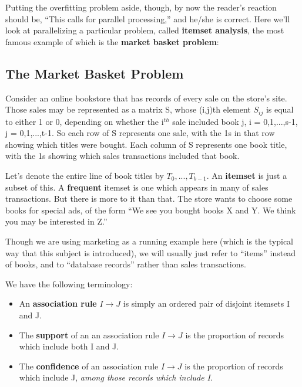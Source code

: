 Putting the overfitting problem aside, though, by now the reader's
reaction should be, ``This calls for parallel processing,'' and he/she
is correct.  Here we'll look at parallelizing a particular problem,
called {\bf itemset analysis}, the most famous example of which is the
{\bf market basket problem}:

\subsection{The Market Basket Problem}

Consider an online bookstore that has records of every sale on the
store's site.  Those sales may be represented as a matrix S, whose
(i,j)th element $S_{ij}$ is equal to either 1 or 0, depending on whether
the i$^{th}$ sale included book j, i = 0,1,...,s-1, j = 0,1,...,t-1.  So
each row of S represents one sale, with the 1s in that row showing which
titles were bought.  Each column of S represents one book title, with
the 1s showing which sales transactions included that book.

Let's denote the entire line of book titles by $T_0,...,T_{b-1}$.  An
{\bf itemset} is just a subset of this.  A {\bf frequent} itemset is one
which appears in many of sales transactions.  But there is more to it
than that.  The store wants to choose some books for special ads, of the
form ``We see you bought books X and Y.  We think you may be interested
in Z.''

Though we are using marketing as a running example here (which is the
typical way that this subject is introduced), we will usually just refer
to ``items'' instead of books, and to ``database records'' rather than
sales transactions.

We have the following terminology:

\begin{itemize}

\item An {\bf association rule} $I \rightarrow J$ is simply an ordered
pair of disjoint itemsets I and J.

\item The {\bf support} of an an association rule $I \rightarrow J$ is
the proportion of records which include both I and J.

\item The {\bf confidence} of an association rule $I \rightarrow J$ is
the proportion of records which include J, {\it among those records
which include I}.

\end{itemize}

